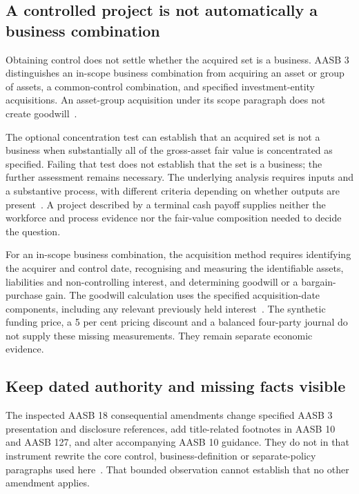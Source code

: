 \subsection{A controlled project is not automatically a business combination}

Obtaining control does not settle whether the acquired set is a business. AASB 3 distinguishes an in-scope business combination from acquiring an asset or group of assets, a common-control combination, and specified investment-entity acquisitions. An asset-group acquisition under its scope paragraph does not create goodwill~\citep[paras.~2--3]{aasb3scope2026}.

The optional concentration test can establish that an acquired set is not a business when substantially all of the gross-asset fair value is concentrated as specified. Failing that test does not establish that the set is a business; the further assessment remains necessary. The underlying analysis requires inputs and a substantive process, with different criteria depending on whether outputs are present~\citep[paras.~B7A--B12D]{aasb3scope2026}. A project described by a terminal cash payoff supplies neither the workforce and process evidence nor the fair-value composition needed to decide the question.

For an in-scope business combination, the acquisition method requires identifying the acquirer and control date, recognising and measuring the identifiable assets, liabilities and non-controlling interest, and determining goodwill or a bargain-purchase gain. The goodwill calculation uses the specified acquisition-date components, including any relevant previously held interest~\citep[paras.~4--10, 32--33]{aasb3scope2026}. The synthetic funding price, a 5 per cent pricing discount and a balanced four-party journal do not supply these missing measurements. They remain separate economic evidence.

\subsection{Keep dated authority and missing facts visible}

The inspected AASB 18 consequential amendments change specified AASB 3 presentation and disclosure references, add title-related footnotes in AASB 10 and AASB 127, and alter accompanying AASB 10 guidance. They do not in that instrument rewrite the core control, business-definition or separate-policy paragraphs used here~\citep[Appendix D, pp.~57, 70, 101--102]{aasb18scope2024}. That bounded observation cannot establish that no other amendment applies.

